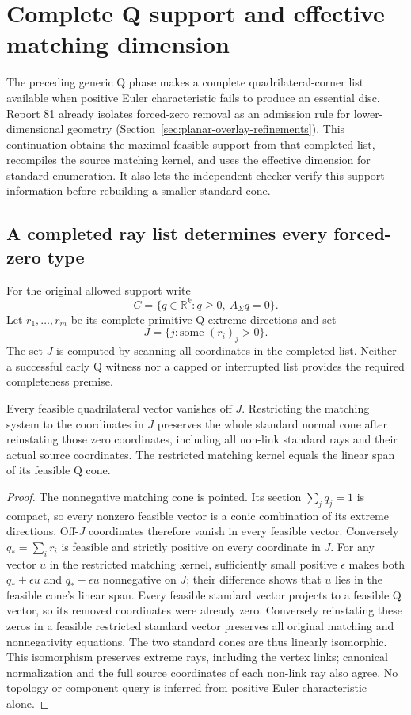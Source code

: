 \section{Complete Q support and effective matching dimension}
\label{sec:feasible-span}

The preceding generic Q phase makes a complete quadrilateral-corner list
available when positive Euler characteristic fails to produce an essential
disc. Report 81 already isolates forced-zero removal as an admission rule
for lower-dimensional geometry (Section~\ref{sec:planar-overlay-refinements}).
This continuation obtains the maximal feasible support from that completed
list, recompiles the source matching kernel, and uses the effective dimension
for standard enumeration. It also lets the independent checker verify this
support information before rebuilding a smaller standard cone.

\subsection{A completed ray list determines every forced-zero type}

For the original allowed support write
\[
 C=\{q\in\mathbb R^k:q\ge0,\ A_\Sigma q=0\}.
\]
Let $r_1,\ldots,r_m$ be its complete primitive Q extreme directions and set
\[
 J=\{j:\text{some }(r_i)_j>0\}.
\]
The set $J$ is computed by scanning all coordinates in the completed list.
Neither a successful early Q witness nor a capped or interrupted list
provides the required completeness premise.

\begin{proposition}
Every feasible quadrilateral vector vanishes off $J$. Restricting the
matching system to the coordinates in $J$ preserves the whole standard
normal cone after reinstating those zero coordinates, including all
non-link standard rays and their actual source coordinates. The restricted
matching kernel equals the linear span of its feasible Q cone.
\end{proposition}
\begin{proof}
The nonnegative matching cone is pointed. Its section $\sum_jq_j=1$ is
compact, so every nonzero feasible vector is a conic combination of its
extreme directions. Off-$J$ coordinates therefore vanish in every feasible
vector. Conversely $q_* = \sum_i r_i$ is feasible and strictly positive
on every coordinate in $J$. For any vector $u$ in the restricted matching
kernel, sufficiently small positive $\epsilon$ makes both
$q_*+\epsilon u$ and $q_*-\epsilon u$ nonnegative on $J$; their difference
shows that $u$ lies in the feasible cone's linear span.
Every feasible standard vector projects to a feasible Q vector, so its
removed coordinates were already zero. Conversely reinstating these zeros
in a feasible restricted standard vector preserves all original matching
and nonnegativity equations. The two standard cones are thus linearly
isomorphic. This isomorphism preserves extreme rays, including the vertex
links; canonical normalization and the full source coordinates of each
non-link ray also agree. No topology or component query is inferred from
positive Euler characteristic alone.
\end{proof}

